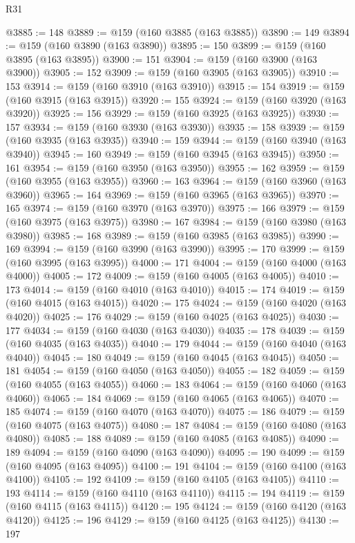 \begin{lexlean}{R31}
\begin{coremodule}
@3885 := 148
@3889 := @159 (@160 @3885 (@163 @3885))
@3890 := 149
@3894 := @159 (@160 @3890 (@163 @3890))
@3895 := 150
@3899 := @159 (@160 @3895 (@163 @3895))
@3900 := 151
@3904 := @159 (@160 @3900 (@163 @3900))
@3905 := 152
@3909 := @159 (@160 @3905 (@163 @3905))
@3910 := 153
@3914 := @159 (@160 @3910 (@163 @3910))
@3915 := 154
@3919 := @159 (@160 @3915 (@163 @3915))
@3920 := 155
@3924 := @159 (@160 @3920 (@163 @3920))
@3925 := 156
@3929 := @159 (@160 @3925 (@163 @3925))
@3930 := 157
@3934 := @159 (@160 @3930 (@163 @3930))
@3935 := 158
@3939 := @159 (@160 @3935 (@163 @3935))
@3940 := 159
@3944 := @159 (@160 @3940 (@163 @3940))
@3945 := 160
@3949 := @159 (@160 @3945 (@163 @3945))
@3950 := 161
@3954 := @159 (@160 @3950 (@163 @3950))
@3955 := 162
@3959 := @159 (@160 @3955 (@163 @3955))
@3960 := 163
@3964 := @159 (@160 @3960 (@163 @3960))
@3965 := 164
@3969 := @159 (@160 @3965 (@163 @3965))
@3970 := 165
@3974 := @159 (@160 @3970 (@163 @3970))
@3975 := 166
@3979 := @159 (@160 @3975 (@163 @3975))
@3980 := 167
@3984 := @159 (@160 @3980 (@163 @3980))
@3985 := 168
@3989 := @159 (@160 @3985 (@163 @3985))
@3990 := 169
@3994 := @159 (@160 @3990 (@163 @3990))
@3995 := 170
@3999 := @159 (@160 @3995 (@163 @3995))
@4000 := 171
@4004 := @159 (@160 @4000 (@163 @4000))
@4005 := 172
@4009 := @159 (@160 @4005 (@163 @4005))
@4010 := 173
@4014 := @159 (@160 @4010 (@163 @4010))
@4015 := 174
@4019 := @159 (@160 @4015 (@163 @4015))
@4020 := 175
@4024 := @159 (@160 @4020 (@163 @4020))
@4025 := 176
@4029 := @159 (@160 @4025 (@163 @4025))
@4030 := 177
@4034 := @159 (@160 @4030 (@163 @4030))
@4035 := 178
@4039 := @159 (@160 @4035 (@163 @4035))
@4040 := 179
@4044 := @159 (@160 @4040 (@163 @4040))
@4045 := 180
@4049 := @159 (@160 @4045 (@163 @4045))
@4050 := 181
@4054 := @159 (@160 @4050 (@163 @4050))
@4055 := 182
@4059 := @159 (@160 @4055 (@163 @4055))
@4060 := 183
@4064 := @159 (@160 @4060 (@163 @4060))
@4065 := 184
@4069 := @159 (@160 @4065 (@163 @4065))
@4070 := 185
@4074 := @159 (@160 @4070 (@163 @4070))
@4075 := 186
@4079 := @159 (@160 @4075 (@163 @4075))
@4080 := 187
@4084 := @159 (@160 @4080 (@163 @4080))
@4085 := 188
@4089 := @159 (@160 @4085 (@163 @4085))
@4090 := 189
@4094 := @159 (@160 @4090 (@163 @4090))
@4095 := 190
@4099 := @159 (@160 @4095 (@163 @4095))
@4100 := 191
@4104 := @159 (@160 @4100 (@163 @4100))
@4105 := 192
@4109 := @159 (@160 @4105 (@163 @4105))
@4110 := 193
@4114 := @159 (@160 @4110 (@163 @4110))
@4115 := 194
@4119 := @159 (@160 @4115 (@163 @4115))
@4120 := 195
@4124 := @159 (@160 @4120 (@163 @4120))
@4125 := 196
@4129 := @159 (@160 @4125 (@163 @4125))
@4130 := 197

\end{coremodule}
\end{lexlean}
